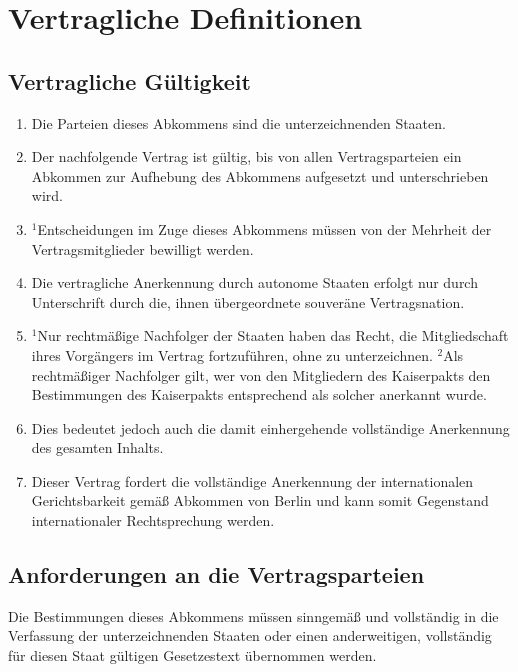 \documentclass{article}
\begin{document}
\section{Vertragliche Definitionen}

\subsection{Vertragliche Gültigkeit}
\begin{enumerate}[(1)]
    \item Die Parteien dieses Abkommens sind die unterzeichnenden Staaten.
    \item Der nachfolgende Vertrag ist gültig, bis von allen Vertragsparteien ein Abkommen zur Aufhebung des Abkommens aufgesetzt und unterschrieben wird.
    \item ${^1}$Entscheidungen im Zuge dieses Abkommens müssen von der Mehrheit der Vertragsmitglieder bewilligt werden.
    \item Die vertragliche Anerkennung durch autonome Staaten erfolgt nur durch Unterschrift durch die, ihnen übergeordnete souveräne Vertragsnation.
    \item ${^1}$Nur rechtmäßige Nachfolger der Staaten haben das Recht, die Mitgliedschaft ihres Vorgängers im Vertrag fortzuführen, ohne zu unterzeichnen. ${^2}$Als rechtmäßiger Nachfolger gilt, wer von den Mitgliedern des Kaiserpakts den Bestimmungen des Kaiserpakts entsprechend als solcher anerkannt wurde.
    \item Dies bedeutet jedoch auch die damit einhergehende vollständige Anerkennung des gesamten Inhalts.
    \item Dieser Vertrag fordert die vollständige Anerkennung der internationalen Gerichtsbarkeit gemäß Abkommen von Berlin und kann somit Gegenstand internationaler Rechtsprechung werden.
\end{enumerate}

\subsection{Anforderungen an die Vertragsparteien}
Die Bestimmungen dieses Abkommens müssen sinngemäß und vollständig in die Verfassung der unterzeichnenden Staaten oder einen anderweitigen, vollständig für diesen Staat gültigen Gesetzestext übernommen werden.
\end{document}
